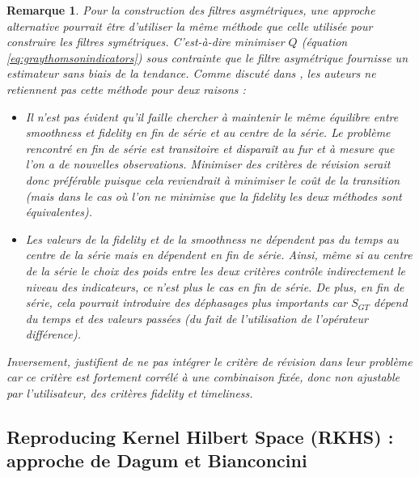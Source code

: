 \documentclass[
  12pt,
  a4paper,french]{article}
\newcommand\1{\mathds{1}}
\newtheorem*{remarque}{Remarque}
\begin{document}
\begin{remarque}
Pour la construction des filtres asymétriques, une approche alternative pourrait être d'utiliser la même méthode que celle utilisée pour construire les filtres symétriques.
C'est-à-dire minimiser \(Q\) (équation \eqref{eq:graythomsonindicators}) sous contrainte que le filtre asymétrique fournisse un estimateur sans biais de la tendance.
Comme discuté dans \textcite{GrayThomson1996}, les auteurs ne retiennent pas cette méthode pour deux raisons :

\begin{itemize}
\item
  Il n'est pas évident qu'il faille chercher à maintenir le même équilibre entre \emph{smoothness} et \emph{fidelity} en fin de série et au centre de la série.
  Le problème rencontré en fin de série est transitoire et disparaît au fur et à mesure que l'on a de nouvelles observations.
  Minimiser des critères de révision serait donc préférable puisque cela reviendrait à minimiser le coût de la transition (mais dans le cas où l'on ne minimise que la \emph{fidelity} les deux méthodes sont équivalentes).
\item
  Les valeurs de la \emph{fidelity} et de la \emph{smoothness} ne dépendent pas du temps au centre de la série mais en dépendent en fin de série.
  Ainsi, même si au centre de la série le choix des poids entre les deux critères contrôle indirectement le niveau des indicateurs, ce n'est plus le cas en fin de série.
  De plus, en fin de série, cela pourrait introduire des déphasages plus importants car \(S_{GT}\) dépend du temps et des valeurs passées (du fait de l'utilisation de l'opérateur différence).
\end{itemize}

Inversement, \textcite{ch15HBSA} justifient de ne pas intégrer le critère de révision dans leur problème car ce critère est fortement corrélé à une combinaison fixée, donc non ajustable par l'utilisateur, des critères \emph{fidelity} et \emph{timeliness}.

\end{remarque}

\hypertarget{sec-rkhs}{%
\subsection{Reproducing Kernel Hilbert Space (RKHS) : approche de Dagum et Bianconcini}\label{sec-rkhs}}
\end{document}
